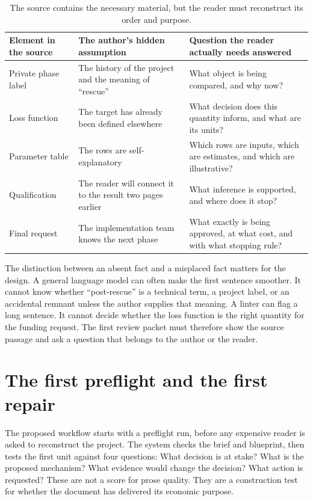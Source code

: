 \begin{table}[H]
\centering
\small
\begin{tabularx}{\textwidth}{@{}p{}L p{0.27\textwidth}@{}}
\toprule
Element in the source & The author's hidden assumption & Question the
reader actually needs answered \\
\midrule
Private phase label & The history of the project and the meaning of ``rescue'' &
What object is being compared, and why now? \\
Loss function & The target has already been defined elsewhere & What decision
does this quantity inform, and what are its units? \\
Parameter table & The rows are self-explanatory & Which rows are inputs, which
are estimates, and which are illustrative? \\
Qualification & The reader will connect it to the result two pages earlier &
What inference is supported, and where does it stop? \\
Final request & The implementation team knows the next phase & What exactly is
being approved, at what cost, and with what stopping rule? \\
\bottomrule
\end{tabularx}
\caption{The source contains the necessary material, but the reader must
reconstruct its order and purpose.}
\label{tab:case-before}
\end{table}

The distinction between an absent fact and a misplaced fact matters for the
design. A general language model can often make the first sentence smoother.
It cannot know whether ``post-rescue'' is a technical term, a project label,
or an accidental remnant unless the author supplies that meaning. A linter can
flag a long sentence. It cannot decide whether the loss function is the right
quantity for the funding request. The first review packet must therefore
show the source passage and ask a question that belongs to the author or the
reader.

\section{The first preflight and the first repair}
\label{sec:case-first-repair}

The proposed workflow starts with a preflight run, before any expensive reader
is asked to reconstruct the project. The system checks the brief and blueprint,
then tests the first unit against four questions: What decision is at stake?
What is the proposed mechanism? What evidence would change the decision? What
action is requested? These are not a score for prose quality. They are a
construction test for whether the document has delivered its economic purpose.

